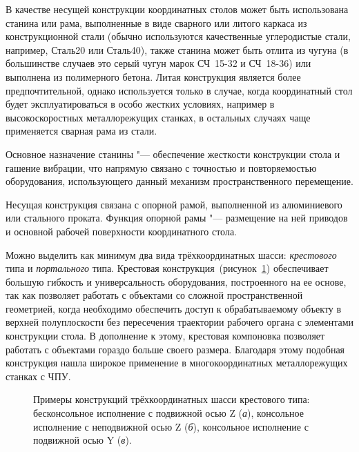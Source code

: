 В качестве несущей конструкции координатных столов может быть использована станина или рама, выполненные в виде сварного или литого каркаса из конструкционной стали (обычно используются качественные углеродистые стали, например, Сталь20 или Сталь40), также станина может быть отлита из чугуна (в большинстве случаев это серый чугун марок СЧ~15-32 и СЧ~18-36) или выполнена из полимерного бетона. Литая конструкция является более предпочтительной, однако используется только в случае, когда координатный стол будет эксплуатироваться в особо жестких условиях, например в высокоскоростных металлорежущих станках, в остальных случаях чаще применяется сварная рама из стали.

Основное назначение станины "--- обеспечение жесткости конструкции стола и гашение вибрации, что напрямую связано с точностью и повторяемостью оборудования, использующего данный механизм пространственного перемещение.

Несущая конструкция связана с опорной рамой, выполненной из алюминиевого или стального проката. Функция опорной рамы "--- размещение на ней приводов и основной рабочей поверхности координатного стола.

Можно выделить как минимум два вида трёхкоординатных шасси: \textit{крестового} типа и \textit{портального} типа. Крестовая конструкция~(рисунок~\cref{fig:cross}) обеспечивает большую гибкость и универсальность оборудования, построенного на ее основе, так как позволяет работать с объектами со сложной пространственной геометрией, когда необходимо обеспечить доступ к обрабатываемому объекту в верхней полуплоскости без пересечения траектории рабочего органа с элементами конструкции стола. В дополнение к этому, крестовая компоновка позволяет работать с объектами гораздо больше своего размера. Благодаря этому подобная конструкция нашла широкое применение в многокоординатных металлорежущих станках с ЧПУ.

\begin{figure}[ht]
	\caption[Примеры конструкций трёхкоординатных шасси крестового типа]%
	{Примеры конструкций трёхкоординатных шасси крестового типа: бесконсольное исполнение с подвижной осью Z (\textit{а}), консольное исполнение с неподвижной осью Z  (\textit{б}), консольное исполнение с подвижной осью Y (\textit{в}).}\label{fig:cross}
\end{figure}

